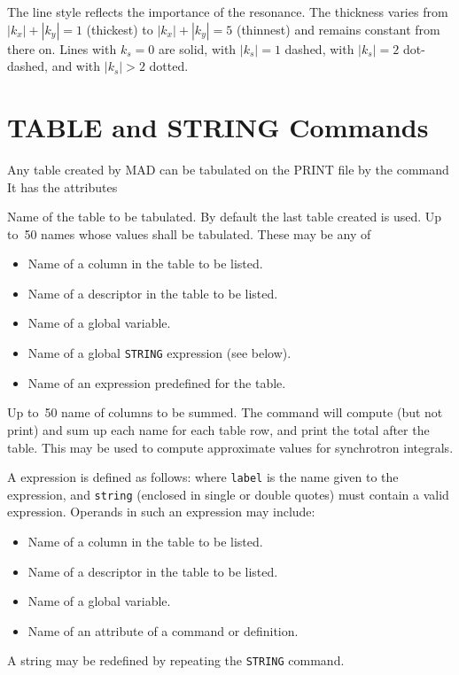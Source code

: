 The line style reflects the importance of the resonance.
The thickness varies from \(|k_x| + |k_y| = 1\) (thickest) to
\(|k_x| + |k_y| = 5\) (thinnest) and remains constant from there on.
Lines with \(k_s = 0\) are solid, with \(|k_s| = 1\) dashed,
with \(|k_s| = 2\) dot-dashed, and with \(|k_s| > 2\) dotted.
 
\section{TABLE and STRING Commands}
\label{S-TABLE}
Any table created by MAD can be tabulated on the PRINT file by the command
It has the attributes
\begin{mylist}
Name of the table to be tabulated.
By default the last table created is used.
Up to~50 names whose values shall be tabulated.
These may be any of
\begin{itemize}
\item Name of a column in the table to be listed.
\item Name of a descriptor in the table to be listed.
\item Name of a global variable.
\item Name of a global {\tt STRING} expression (see below).
\item Name of an expression predefined for the table.
\end{itemize}
Up to~50 name of columns to be summed.
The  command will compute (but not print) and sum up
each name for each table row,
and print the total after the table.
This may be used to compute approximate values for synchrotron integrals.
\end{mylist}
 
A  expression is defined as follows:
where {\tt label} is the name given to the expression,
and {\tt string} (enclosed in single or double quotes)
must contain a valid expression.
Operands in such an expression may include:
\begin{itemize}
\item Name of a column in the table to be listed.
\item Name of a descriptor in the table to be listed.
\item Name of a global variable.
\item Name of an attribute of a command or definition.
\end{itemize}
A string may be redefined by repeating the {\tt STRING} command.
 

